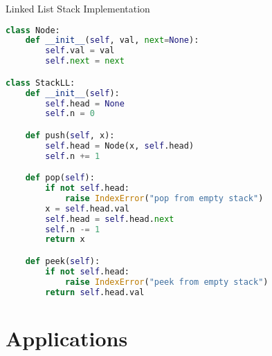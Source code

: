 \documentclass[aspectratio=169,xcolor=dvipsnames]{beamer}
\begin{document}
\begin{frame}[fragile]{Linked List Stack Implementation}
  \begin{lstlisting}[language=Python,basicstyle=\small\ttfamily]
class Node:
    def __init__(self, val, next=None):
        self.val = val
        self.next = next

class StackLL:
    def __init__(self):
        self.head = None
        self.n = 0

    def push(self, x):
        self.head = Node(x, self.head)
        self.n += 1

    def pop(self):
        if not self.head:
            raise IndexError("pop from empty stack")
        x = self.head.val
        self.head = self.head.next
        self.n -= 1
        return x

    def peek(self):
        if not self.head:
            raise IndexError("peek from empty stack")
        return self.head.val
  \end{lstlisting}
\end{frame}

\section{Applications}
\end{document}
